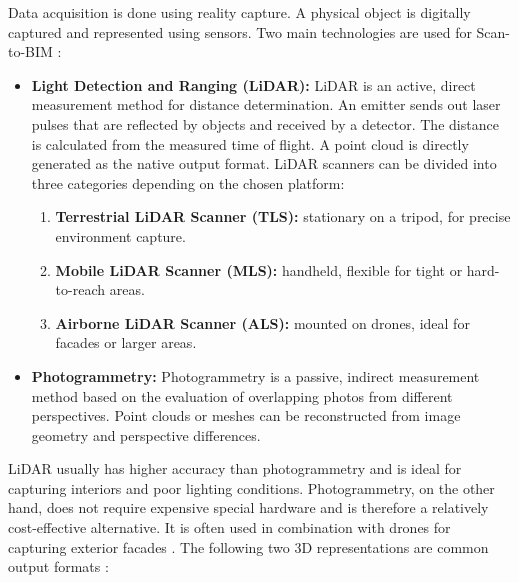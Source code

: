 \begin{English}
    Data acquisition is done using reality capture. A physical object is digitally captured and represented using sensors. Two main technologies are used for Scan-to-BIM \cite{rashdiScanningTechnologiesBuilding2022}:

    \begin{itemize}
        \item \textbf{Light Detection and Ranging (LiDAR):} LiDAR is an active, direct measurement method for distance determination. An emitter sends out laser pulses that are reflected by objects and received by a detector. The distance is calculated from the measured time of flight. A point cloud is directly generated as the native output format. LiDAR scanners can be divided into three categories depending on the chosen platform:
        \begin{enumerate}
            \item \textbf{Terrestrial LiDAR Scanner (TLS):} stationary on a tripod, for precise environment capture.
            \item \textbf{Mobile LiDAR Scanner (MLS):} handheld, flexible for tight or hard-to-reach areas.
            \item \textbf{Airborne LiDAR Scanner (ALS):} mounted on drones, ideal for facades or larger areas.
        \end{enumerate}
        \item \textbf{Photogrammetry:} Photogrammetry is a passive, indirect measurement method based on the evaluation of overlapping photos from different perspectives. Point clouds or meshes can be reconstructed from image geometry and perspective differences.
    \end{itemize}

    LiDAR usually has higher accuracy than photogrammetry and is ideal for capturing interiors and poor lighting conditions. Photogrammetry, on the other hand, does not require expensive special hardware and is therefore a relatively cost-effective alternative. It is often used in combination with drones for capturing exterior facades \cite{rashdiScanningTechnologiesBuilding2022}. The following two 3D representations are common output formats \cite{borrusoProceduralPointCloud2023,liu3DPointCloud2021}:


\end{English}

